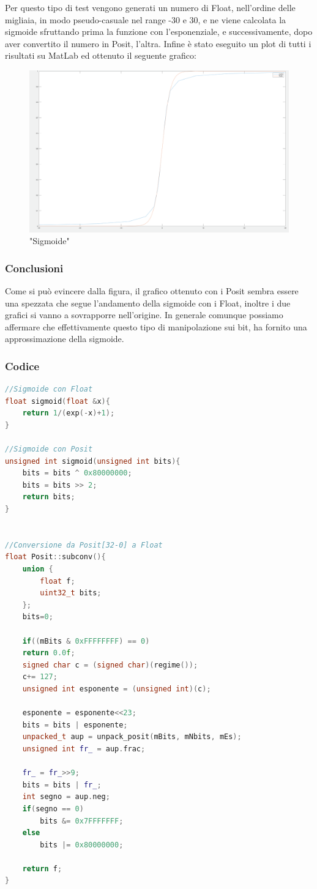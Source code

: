 \documentclass[a4paper,11pt]{article}
\begin{document}
Per questo tipo di test vengono generati un numero di Float, nell'ordine delle migliaia, in modo pseudo-casuale nel range -30 e 30, e ne viene calcolata la sigmoide sfruttando prima la funzione con l'esponenziale, e successivamente, dopo aver convertito il numero in Posit, l'altra.
Infine è stato eseguito un plot di tutti i risultati su MatLab ed ottenuto il seguente grafico:

\begin{figure}[h]
	\includegraphics[scale=0.15]{sigmoide_2}
	\centering
	\caption{"Sigmoide"}
\end{figure}

\subsubsection{Conclusioni}
Come si può evincere dalla figura, il grafico ottenuto con i  Posit sembra essere una spezzata che segue l'andamento della sigmoide con i Float, inoltre i due grafici si vanno a sovrapporre nell'origine. In generale comunque possiamo affermare che effettivamente questo tipo di manipolazione sui bit, ha fornito una approssimazione della sigmoide.

\subsubsection{Codice}

\begin{lstlisting}[language=C++]
//Sigmoide con Float
float sigmoid(float &x){
	return 1/(exp(-x)+1);
}

//Sigmoide con Posit
unsigned int sigmoid(unsigned int bits){
	bits = bits ^ 0x80000000;
	bits = bits >> 2;
	return bits;
}


//Conversione da Posit[32-0] a Float
float Posit::subconv(){
	union {
		float f;
		uint32_t bits;
	};
	bits=0;
	
	if((mBits & 0xFFFFFFFF) == 0)
	return 0.0f;
	signed char c = (signed char)(regime());
	c+= 127;
	unsigned int esponente = (unsigned int)(c);	
	
	esponente = esponente<<23;
	bits = bits | esponente;
	unpacked_t aup = unpack_posit(mBits, mNbits, mEs);
	unsigned int fr_ = aup.frac;
	
	fr_ = fr_>>9;
	bits = bits | fr_;
	int segno = aup.neg;
	if(segno == 0)
		bits &= 0x7FFFFFFF;
	else
		bits |= 0x80000000;
	
	return f;
}
\end{lstlisting}
\newpage
\end{document}
